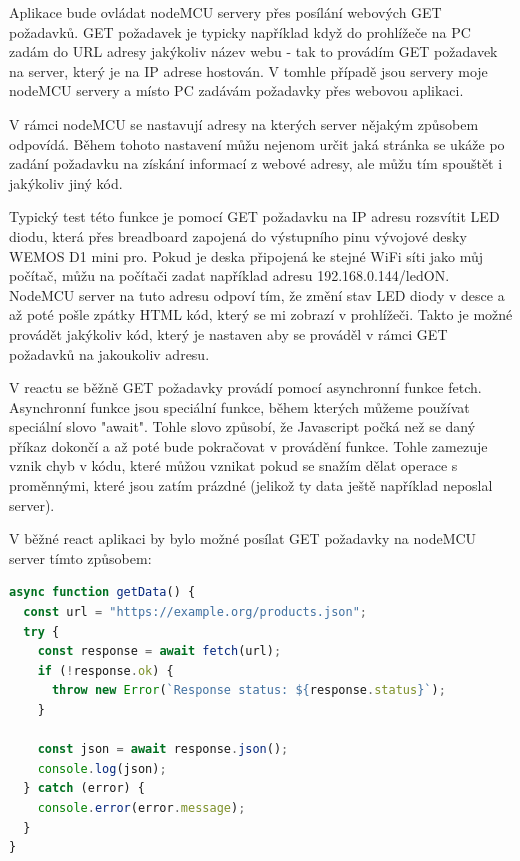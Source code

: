 Aplikace bude ovládat nodeMCU servery přes posílání webových GET požadavků. GET požadavek je typicky například když do prohlížeče na PC zadám do URL adresy jakýkoliv název webu - tak to provádím GET požadavek na server, který je na IP adrese hostován. V tomhle případě jsou servery moje nodeMCU servery a místo PC zadávám požadavky přes webovou aplikaci.

V rámci nodeMCU se nastavují adresy na kterých server nějakým způsobem odpovídá. Během tohoto nastavení můžu nejenom určit jaká stránka se ukáže po zadání požadavku na získání informací z webové adresy, ale můžu tím spouštět i jakýkoliv jiný kód.

Typický test této funkce je pomocí GET požadavku na IP adresu rozsvítit LED diodu, která přes breadboard zapojená do výstupního pinu vývojové desky WEMOS D1 mini pro. Pokud je deska připojená ke stejné WiFi síti jako můj počítač, můžu na počítači zadat například adresu 192.168.0.144/ledON. NodeMCU server na tuto adresu odpoví tím, že změní stav LED diody v desce a až poté pošle zpátky HTML kód, který se mi zobrazí v prohlížeči. Takto je možné provádět jakýkoliv kód, který je nastaven aby se prováděl v rámci GET požadavků na jakoukoliv adresu.

V reactu se běžně GET požadavky provádí pomocí asynchronní funkce fetch. Asynchronní funkce jsou speciální funkce, během kterých můžeme používat speciální slovo "await". Tohle slovo způsobí, že Javascript počká než se daný příkaz dokončí a až poté bude pokračovat v provádění funkce. Tohle zamezuje vznik chyb v kódu, které můžou vznikat pokud se snažím dělat operace s proměnnými, které jsou zatím prázdné (jelikož ty data ještě například neposlal server).

V běžné react aplikaci by bylo možné posílat GET požadavky na nodeMCU server tímto způsobem:

\begin{lstlisting}[language=JavaScript, caption={Základní způsob posílání GET požadavků v JavaScriptu}, label={lst:JavaScriptFetchFunkce}]
async function getData() {
  const url = "https://example.org/products.json";
  try {
    const response = await fetch(url);
    if (!response.ok) {
      throw new Error(`Response status: ${response.status}`);
    }

    const json = await response.json();
    console.log(json);
  } catch (error) {
    console.error(error.message);
  }
}
\end{lstlisting}


